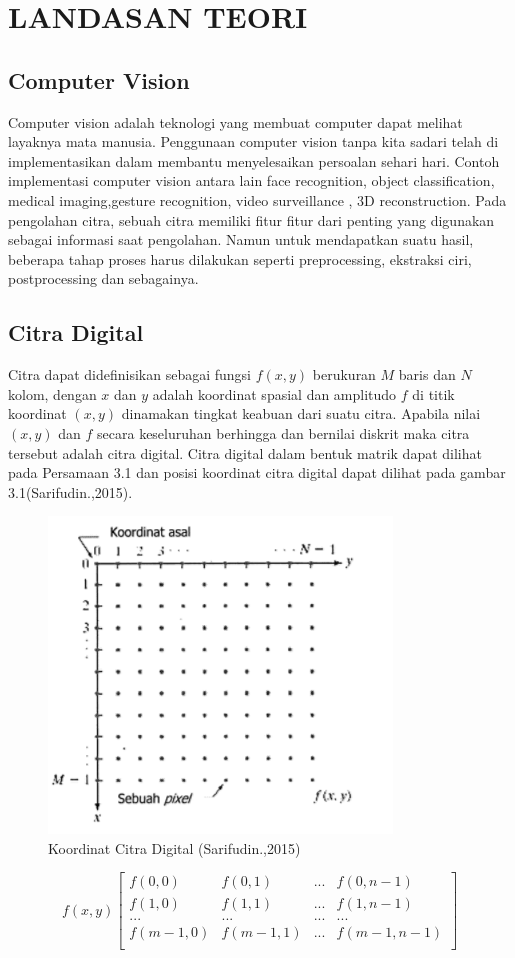 \chapter{LANDASAN TEORI}
\section{Computer Vision}
Computer vision adalah teknologi yang membuat computer dapat melihat layaknya mata manusia. Penggunaan computer vision tanpa kita sadari telah di implementasikan dalam membantu menyelesaikan persoalan sehari hari. Contoh implementasi computer vision antara lain face recognition, object classification, medical imaging,gesture recognition, video surveillance , 3D reconstruction. Pada pengolahan citra, sebuah citra memiliki fitur fitur dari penting yang digunakan sebagai informasi saat pengolahan. Namun untuk mendapatkan suatu hasil, beberapa tahap proses harus dilakukan seperti preprocessing, ekstraksi ciri, postprocessing dan sebagainya.
\section{Citra Digital}
Citra dapat didefinisikan sebagai fungsi \(f(x,y)\) berukuran \(M\) baris dan \(N\) kolom, dengan \(x\)  dan \(y\) adalah koordinat spasial dan amplitudo \(f\)  di titik koordinat \((x,y)\) dinamakan tingkat keabuan dari suatu citra. Apabila nilai \((x,y)\) dan \(f\) secara keseluruhan berhingga dan bernilai diskrit maka citra tersebut adalah citra digital. Citra digital dalam bentuk matrik dapat dilihat pada Persamaan 3.1 dan posisi koordinat citra digital dapat dilihat pada gambar 3.1(Sarifudin.,2015).

\begin{figure}[H]
	\centering
	\includegraphics[width=0.3\linewidth]{screenshot001}
	\caption{Koordinat Citra Digital (Sarifudin.,2015)}
	\label{fig:screenshot001}
\end{figure}


\begin{equation}
f(x,y)
\begin{bmatrix}
f(0,0) & f(0,1) & ... & f(0,n-1)\\
f(1,0) & f(1,1) & ... & f(1,n-1)\\
... & ... & ... & ...\\
f(m-1,0) & f(m-1,1) & ... & f(m-1,n-1)\\
\end{bmatrix}
\end{equation}

